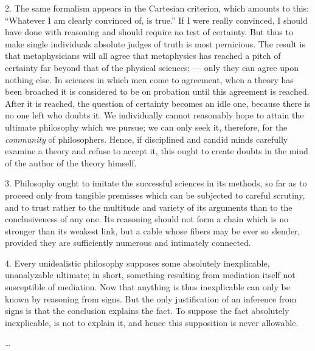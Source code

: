 2. The same formalism appears in the Cartesian criterion, which amounts to this: ``Whatever I am clearly convinced of, is true.'' If I were really convinced, I should have done with reasoning and should require no test of certainty. But thus to make single individuals absolute judges of truth is most pernicious. The result is that metaphysicians will all agree that metaphysics has reached a pitch of certainty far beyond that of the physical sciences; --- only they can agree upon nothing else. In sciences in which men come to agreement, when a theory has been broached it is considered to be on probation until this agreement is reached. After it is reached, the question of certainty becomes an idle one, because there is no one left who doubts it. We individually cannot reasonably hope to attain the ultimate philosophy which we pursue; we can only seek it, therefore, for the \emph{community} of philosophers. Hence, if disciplined and candid minds carefully examine a theory and refuse to accept it, this ought to create doubts in the mind of the author of the theory himself.

3. Philosophy ought to imitate the successful sciences in its methods, so far as to proceed only from tangible premisses which can be subjected to careful scrutiny, and to trust rather to the multitude and variety of its arguments than to the conclusiveness of any one. Its reasoning should not form a chain which is no stronger than its weakest link, but a cable whose fibers may be ever so slender, provided they are sufficiently numerous and intimately connected.

4. Every unidealistic philosophy supposes some absolutely inexplicable, unanalyzable ultimate; in short, something resulting from mediation itself not susceptible of mediation. Now that anything is thus inexplicable can only be known by reasoning from signs. But the only justification of an inference from signs is that the conclusion explains the fact. To suppose the fact absolutely inexplicable, is not to explain it, and hence this supposition is never allowable.

\ldots
